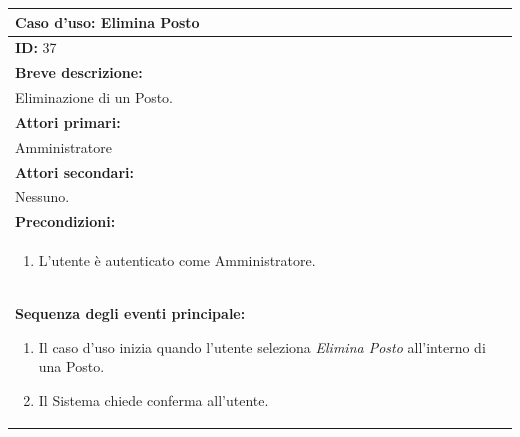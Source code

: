 \documentclass{article}
\begin{document}
                \begin{table}[H]
                    \begin{tabular}{|p{\linewidth}|}
                        \hline
                        \cellcolor{gray!100}
                        \color{white}
                        \centerline{\textbf{Caso d'uso:} Elimina Posto} \\
                        \hline
                        \textbf{ID:} 37 \\
                        \hline
                        \cellcolor{gray!20}
                        \textbf{Breve descrizione:} \\
                        \cellcolor{gray!20}
                        Eliminazione di un Posto. \\
                        \hline
                        \textbf{Attori primari:} \\
                        \begin{minipage}{\linewidth}
                            Amministratore
                        \end{minipage}
                        \vspace{-10pt} \\ 
                        \hline
                        \textbf{Attori secondari:} \\
                        Nessuno. \\
                        \hline
                        \cellcolor{gray!20}
                        \textbf{Precondizioni:} \\
                        \cellcolor{gray!20}
                        \begin{minipage}{\linewidth}
                            \begin{enumerate}
                                \item L'utente è autenticato come Amministratore.
                            \end{enumerate}
                        \end{minipage} \\
                        \hline
                        \textbf{Sequenza degli eventi principale:}
                        \begin{enumerate}
                            \item Il caso d'uso inizia quando l'utente seleziona \textit{Elimina Posto} all'interno di una Posto.
                            \item Il Sistema chiede conferma all'utente.

\end{enumerate}
\end{tabular}
\end{table}
\end{document}
